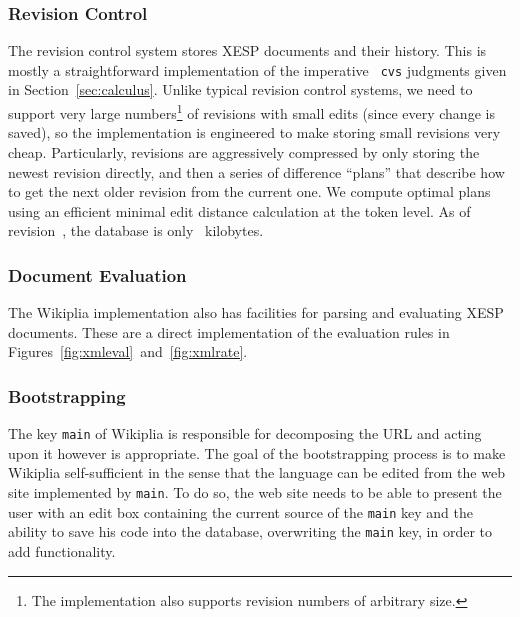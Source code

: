 \documentclass[twocolumn]{article}
\begin{document}
\subsubsection{Revision Control}

The revision control system stores XESP documents and their history.
This is mostly a straightforward implementation of the imperative {\tt
cvs} judgments given in Section~\ref{sec:calculus}. Unlike typical
revision control systems, we need to support very large
numbers\footnote{The implementation also supports revision numbers of
arbitrary size.} of revisions with small edits (since every change is
saved), so the implementation is engineered to make storing small
revisions very cheap. Particularly, revisions are aggressively
compressed by only storing the newest revision directly, and then a
series of difference ``plans'' that describe how to get the next older
revision from the current one. We compute optimal plans using an
efficient minimal edit distance
calculation at the token level. As of
revision~\currentrevision, the database is only \currentsizekb\ 
kilobytes.\z{}

\subsubsection{Document Evaluation}

The Wikiplia implementation also has facilities for parsing and
evaluating XESP documents. These are a direct implementation of the
evaluation rules in Figures~\ref{fig:xmleval}~and~\ref{fig:xmlrate}.

\subsubsection{Bootstrapping}

The key {\tt main} of Wikiplia is responsible for decomposing the URL
and acting upon it however is appropriate. The goal of the
bootstrapping process is to make Wikiplia
self-sufficient in the sense that the language
can be edited from the web site implemented by {\tt main}. To do so, the
web site needs to be able to present the user with an edit box
containing the current source of the {\tt main} key and the ability to
save his code into the database, overwriting the {\tt main} key, in
order to add functionality.
\end{document}
